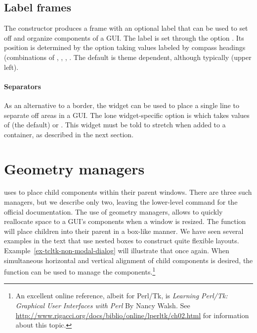 \subsection{Label frames}
\label{sec:tcltk:label-frames}

The  constructor produces a frame with an
optional label that can be used to set off and organize components of
a GUI. The label is set through the option
. Its position is determined by the option
 taking values labeled by compass
headings (combinations of , , , . The
default is theme dependent, although typically  (upper
left).

\paragraph{Separators}
As an alternative to a border, the  widget can be used
to place a single line to separate off areas in a GUI. The lone
widget-specific option is  which takes
values of  (the default) or . This
widget must be told to stretch when added to a container, as described
in the next section.

\section{Geometry managers}
\label{sec:tcltk:geometry-managers}

\TCL\/ uses  to place child
components within their parent windows. There are three such managers,
but we describe only two, leaving the lower-level  command
for the official documentation. The use of geometry managers, allows
\TK\/ to quickly reallocate space to a GUI's components when a window
is resized.  The  function will place children into
their parent in a box-like manner. We have seen several examples in
the text that use nested boxes to construct quite flexible layouts.
Example~\ref{ex-tcltk-non-modal-dialog} will illustrate that once
again. When simultaneous horizontal and vertical alignment of child
components is desired, the  function can be used to
manage the components.\footnote{An excellent online reference,
  albeit for Perl/Tk, is \textit{Learning Perl/Tk: Graphical User
    Interfaces with Perl} By Nancy Walsh. See
  \url{http://www.rigacci.org/docs/biblio/online/lperltk/ch02.html}
  for information about this topic.}
\\


